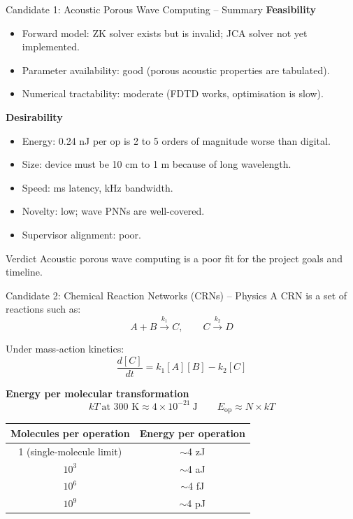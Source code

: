 \documentclass[aspectratio=169,11pt]{beamer}
\begin{document}
\begin{frame}{Candidate 1: Acoustic Porous Wave Computing -- Summary}
  \small
  \textbf{Feasibility}
  \begin{itemize}
    \item Forward model: ZK solver exists but is invalid; JCA solver not yet implemented.
    \item Parameter availability: good (porous acoustic properties are tabulated).
    \item Numerical tractability: moderate (FDTD works, optimisation is slow).
  \end{itemize}

  \vspace{0.1cm}
  \textbf{Desirability}
  \begin{itemize}
    \item Energy: 0.24 nJ per op is 2 to 5 orders of magnitude worse than digital.
    \item Size: device must be 10 cm to 1 m because of long wavelength.
    \item Speed: ms latency, kHz bandwidth.
    \item Novelty: low; wave PNNs are well-covered.
    \item Supervisor alignment: poor.
  \end{itemize}

  \vspace{0.1cm}
  \begin{block}{Verdict}
    Acoustic porous wave computing is a poor fit for the project goals and timeline.
  \end{block}
\end{frame}

\begin{frame}{Candidate 2: Chemical Reaction Networks (CRNs) -- Physics}
  \small
  A CRN is a set of reactions such as:
  \[
    A + B \xrightarrow{k_1} C,
    \qquad
    C \xrightarrow{k_2} D
  \]

  Under mass-action kinetics:
  \[
    \frac{d[C]}{dt} = k_1 [A][B] - k_2 [C]
  \]

  \vspace{0.1cm}
  \textbf{Energy per molecular transformation}
  \[
    kT\ \text{at 300 K} \approx 4 \times 10^{-21}\ \text{J}
    \qquad
    E_{\text{op}} \approx N \times kT
  \]

  \begin{center}
    \footnotesize
    \begin{tabular}{cc}
      \toprule
      Molecules per operation & Energy per operation \\
      \midrule
      1 (single-molecule limit) & $\sim$4 zJ \\
      $10^3$ & $\sim$4 aJ \\
      $10^6$ & $\sim$4 fJ \\
      $10^9$ & $\sim$4 pJ \\
      \bottomrule
    \end{tabular}
  \end{center}
\end{frame}
\end{document}
